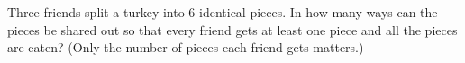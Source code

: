 Three friends split a turkey into $6$ identical pieces. In how many ways can the pieces be shared out so that every friend gets at least one piece and all the pieces are eaten? (Only the number of pieces each friend gets matters.)
